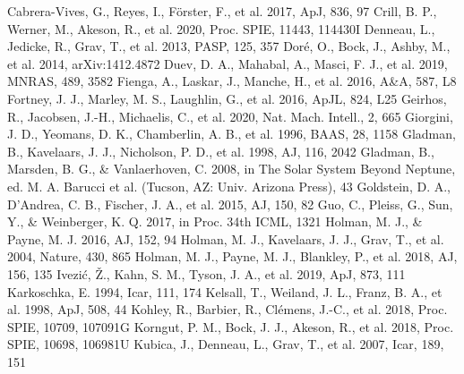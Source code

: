\documentclass[twocolumn,linenumbers]{aastex702}
\begin{document}
\begin{thebibliography}{}
 Cabrera-Vives, G., Reyes, I., F{\"o}rster, F., et al. 2017, ApJ, 836, 97
 Crill, B. P., Werner, M., Akeson, R., et al. 2020, Proc. SPIE, 11443, 114430I
 Denneau, L., Jedicke, R., Grav, T., et al. 2013, PASP, 125, 357
 Dor{\'e}, O., Bock, J., Ashby, M., et al. 2014, arXiv:1412.4872
 Duev, D. A., Mahabal, A., Masci, F. J., et al. 2019, MNRAS, 489, 3582
 Fienga, A., Laskar, J., Manche, H., et al. 2016, A\&A, 587, L8
 Fortney, J. J., Marley, M. S., Laughlin, G., et al. 2016, ApJL, 824, L25
 Geirhos, R., Jacobsen, J.-H., Michaelis, C., et al. 2020, Nat. Mach. Intell., 2, 665
 Giorgini, J. D., Yeomans, D. K., Chamberlin, A. B., et al. 1996, BAAS, 28, 1158
 Gladman, B., Kavelaars, J. J., Nicholson, P. D., et al. 1998, AJ, 116, 2042
 Gladman, B., Marsden, B. G., \& Vanlaerhoven, C. 2008, in The Solar System Beyond Neptune, ed. M. A. Barucci et al. (Tucson, AZ: Univ. Arizona Press), 43
 Goldstein, D. A., D'Andrea, C. B., Fischer, J. A., et al. 2015, AJ, 150, 82
 Guo, C., Pleiss, G., Sun, Y., \& Weinberger, K. Q. 2017, in Proc. 34th ICML, 1321
 Holman, M. J., \& Payne, M. J. 2016, AJ, 152, 94
 Holman, M. J., Kavelaars, J. J., Grav, T., et al. 2004, Nature, 430, 865
 Holman, M. J., Payne, M. J., Blankley, P., et al. 2018, AJ, 156, 135
 Ivezi{\'c}, {\v Z}., Kahn, S. M., Tyson, J. A., et al. 2019, ApJ, 873, 111
 Karkoschka, E. 1994, Icar, 111, 174
 Kelsall, T., Weiland, J. L., Franz, B. A., et al. 1998, ApJ, 508, 44
 Kohley, R., Barbier, R., Cl\'emens, J.-C., et al. 2018, Proc. SPIE, 10709, 107091G
 Korngut, P. M., Bock, J. J., Akeson, R., et al. 2018, Proc. SPIE, 10698, 106981U
 Kubica, J., Denneau, L., Grav, T., et al. 2007, Icar, 189, 151

\end{thebibliography}
\end{document}
